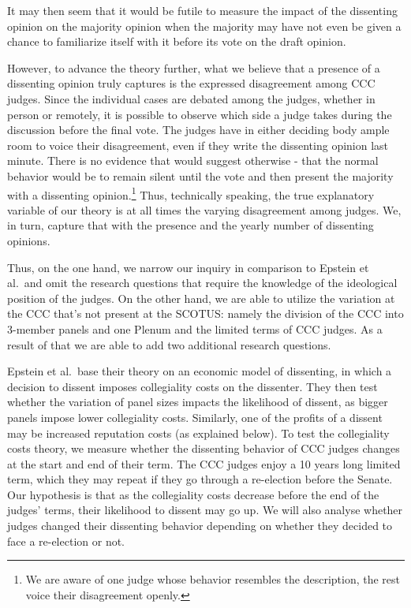 \documentclass[
  11pt,
]{article}
\begin{document}
It may then seem that it would be futile to measure the impact of the
dissenting opinion on the majority opinion when the majority may have
not even be given a chance to familiarize itself with it before its vote
on the draft opinion.

However, to advance the theory further, what we believe that a presence
of a dissenting opinion truly captures is the expressed disagreement
among CCC judges. Since the individual cases are debated among the
judges, whether in person or remotely, it is possible to observe which
side a judge takes during the discussion before the final vote. The
judges have in either deciding body ample room to voice their
disagreement, even if they write the dissenting opinion last minute.
There is no evidence that would suggest otherwise - that the normal
behavior would be to remain silent until the vote and then present the
majority with a dissenting opinion.\footnote{We are aware of one judge
  whose behavior resembles the description, the rest voice their
  disagreement openly.} Thus, technically speaking, the true explanatory
variable of our theory is at all times the varying disagreement among
judges. We, in turn, capture that with the presence and the yearly
number of dissenting opinions.

Thus, on the one hand, we narrow our inquiry in comparison to Epstein et
al.~and omit the research questions that require the knowledge of the
ideological position of the judges. On the other hand, we are able to
utilize the variation at the CCC that's not present at the SCOTUS:
namely the division of the CCC into 3-member panels and one Plenum and
the limited terms of CCC judges. As a result of that we are able to add
two additional research questions.

Epstein et al.~base their theory on an economic model of dissenting, in
which a decision to dissent imposes collegiality costs on the dissenter.
They then test whether the variation of panel sizes impacts the
likelihood of dissent, as bigger panels impose lower collegiality costs.
Similarly, one of the profits of a dissent may be increased reputation
costs (as explained below). To test the collegiality costs theory, we
measure whether the dissenting behavior of CCC judges changes at the
start and end of their term. The CCC judges enjoy a 10 years long
limited term, which they may repeat if they go through a re-election
before the Senate. Our hypothesis is that as the collegiality costs
decrease before the end of the judges' terms, their likelihood to
dissent may go up. We will also analyse whether judges changed their
dissenting behavior depending on whether they decided to face a
re-election or not.
\end{document}
